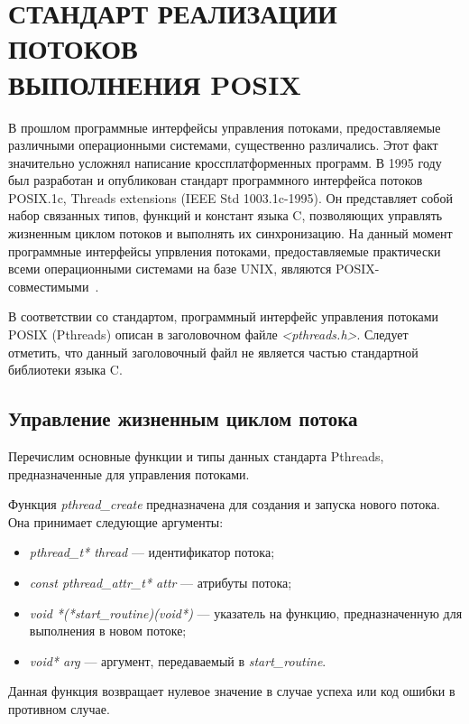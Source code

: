 \section[Стандарт реализации потоков выполнения POSIX]{%
  СТАНДАРТ РЕАЛИЗАЦИИ ПОТОКОВ \\
  ВЫПОЛНЕНИЯ POSIX}

В прошлом программные интерфейсы управления потоками,
предоставляемые различными операционными системами, существенно различались.
Этот факт значительно усложнял написание кроссплатформенных программ.
В 1995 году был разработан и опубликован стандарт
программного интерфейса потоков POSIX.1c, Threads extensions
(IEEE Std 1003.1c-1995).
Он представляет собой набор связанных типов, функций и констант
языка C, позволяющих управлять жизненным циклом потоков
и выполнять их синхронизацию.
На данный момент программные интерфейсы упрвления потоками,
предоставляемые практически всеми операционными системами
на базе UNIX, являются POSIX-совместимыми~\cite{pthreads_programming}.

В соответствии со стандартом, программный интерфейс управления потоками
POSIX (Pthreads) описан в заголовочном файле \textit{<pthreads.h>}.
Следует отметить, что данный заголовочный файл не является частью
стандартной библиотеки языка C.

\subsection{Управление жизненным циклом потока}

Перечислим основные функции и типы данных стандарта Pthreads,
предназначенные для управления потоками.

Функция \textit{pthread\_create} предназначена для создания и запуска
нового потока.
Она принимает следующие аргументы:
\begin{itemize}
  \item \textit{pthread\_t* thread} --- идентификатор потока;
  \item \textit{const pthread\_attr\_t* attr} --- атрибуты потока;
  \item \textit{void *(*start\_routine)(void*)} --- указатель на функцию,
    предназначенную для выполнения в новом потоке;
  \item \textit{void* arg} --- аргумент, передаваемый в \textit{start\_routine}.
\end{itemize}

Данная функция возвращает нулевое значение в случае успеха
или код ошибки в противном случае.

